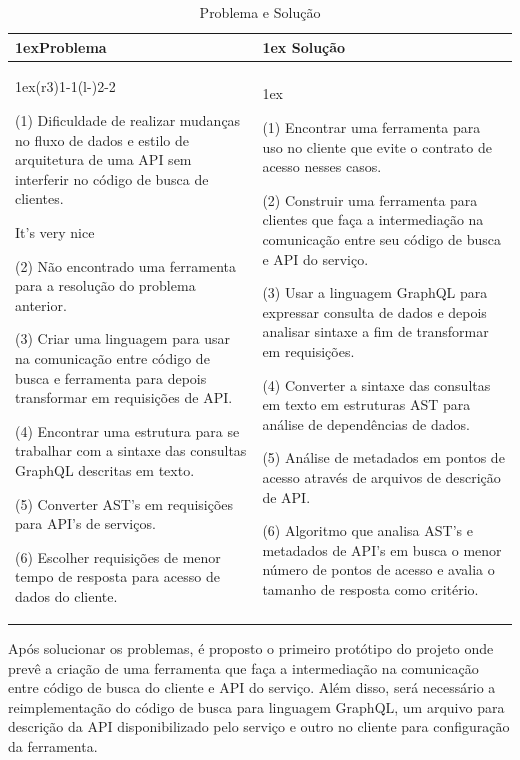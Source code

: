 \begin{table}
  \begin{tabularx}{\linewidth}{>{\parskip1ex}X@{\kern4\tabcolsep}>{\parskip1ex}X}
    \toprule
    \hfil\bfseries Problema
    &
    \hfil\bfseries Solução
    \\\cmidrule(r{3\tabcolsep}){1-1}\cmidrule(l{-\tabcolsep}){2-2}

    (1) Dificuldade de realizar mudanças no fluxo de dados e estilo de arquitetura de uma API sem interferir no código de busca de clientes.\par
It's very nice\par
    (2) Não encontrado uma ferramenta para a resolução do problema anterior.\par
    (3) Criar uma linguagem para usar na comunicação entre código de busca e ferramenta para depois transformar em requisições de API.\par
    (4) Encontrar uma estrutura para se trabalhar com a sintaxe das consultas GraphQL descritas em texto.\par
    (5) Converter AST's em requisições para API's de serviços.\par
    (6) Escolher requisições de menor tempo de resposta para acesso de dados do cliente.
    
    &

    (1) Encontrar uma ferramenta para uso no cliente que evite o contrato de acesso nesses casos.\par
    (2) Construir uma ferramenta para clientes que faça a intermediação na comunicação entre seu código de busca e API do serviço.\par
    (3) Usar a linguagem GraphQL para expressar consulta de dados e depois analisar sintaxe a fim de transformar em requisições.\par
    (4) Converter a sintaxe das consultas em texto em estruturas AST para análise de dependências de dados.\par
    (5) Análise de metadados em pontos de acesso através de arquivos de descrição de API.\par
    (6) Algoritmo que analisa AST's e metadados de API's em busca o menor número de pontos de acesso e avalia o tamanho de resposta como critério.

    \\\bottomrule
  \end{tabularx}
  \caption{Problema e Solução}
\end{table}

Após solucionar os problemas, é proposto o primeiro protótipo do projeto onde prevê a criação de uma ferramenta que faça a intermediação na comunicação entre código de busca do cliente e API do serviço. Além disso, será necessário a reimplementação do código de busca para linguagem GraphQL, um arquivo para descrição da API disponibilizado pelo serviço e outro no cliente para configuração da ferramenta.

